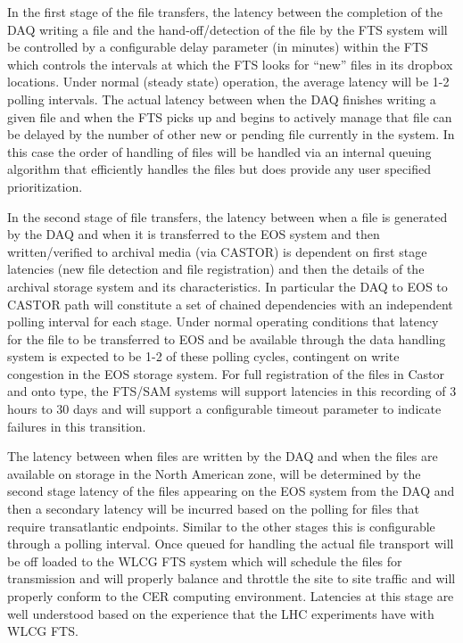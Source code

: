 \documentclass[pdftex,12pt,letter]{article}
\begin{document}
In the first stage of the file transfers, the latency between the completion of the DAQ writing a file and the hand-off/detection of the file by the
FTS system will be controlled by a configurable delay parameter (in minutes) within the FTS which controls the intervals at which the FTS looks for
``new'' files in its dropbox locations.  Under normal (steady state) operation, the average latency will be 1-2 polling intervals.
The actual latency between when the DAQ finishes writing a given file and when the FTS picks up and begins to actively manage
that file can be delayed by the number of other new or pending file currently in the system.  In this case the order of handling of
files will be handled via an internal queuing algorithm that efficiently handles the files but does provide any user specified prioritization.

In the second stage of file transfers, the latency between when a file is generated by the DAQ and when it is transferred to the EOS
system and then written/verified to archival media (via CASTOR) is dependent on first stage latencies (new file detection and file registration)
and then the details of the archival storage system and its characteristics.  In particular the DAQ to EOS to CASTOR path will constitute a set
of chained dependencies with an independent polling interval for each stage.  Under normal operating conditions that latency for the file to
be transferred to EOS and be available through the data handling system is expected to be 1-2 of these polling cycles, contingent on write
congestion in the EOS storage system.   For full registration of the files in Castor and onto type, the FTS/SAM systems will support latencies
in this recording of 3 hours to 30 days and will support a configurable timeout parameter to indicate failures in this transition.

The latency between when files are written by the DAQ and when the files are available on storage in the North American zone,
will be determined by the second stage latency of the files appearing on the EOS system from the DAQ and then a secondary latency
will be incurred based on the polling for files that require transatlantic endpoints.  Similar to the other stages this is configurable
through a polling interval.  Once queued for handling the actual file transport will be off loaded to the WLCG FTS system which will
schedule the files for transmission and will properly balance and throttle the site to site traffic and will properly conform to the CER
 computing environment.  Latencies at this stage are well understood based on the experience that the LHC experiments have with WLCG FTS.  
\end{document}
